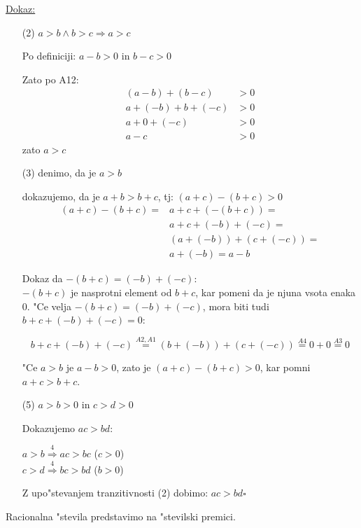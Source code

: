 \underline{Dokaz:}
\begin{enumerate}
	\item[(2)] \(a > b \land b > c \Rightarrow a > c\)
	
	Po definiciji: \(a - b > 0\) in \(b - c > 0\)
	
	Zato po A12:
	\begin{align*}
		(a -b) + (b -c) &> 0\\
		a + (-b) + b + (-c) &> 0\\
		a + 0 + (-c) &> 0 \\
		a - c &> 0
	\end{align*}
	zato \(a > c\)
	
	\item[(3)] denimo, da je \(a > b\)
	
	dokazujemo, da je \(a + b > b + c\), tj: \((a + c) - (b + c) > 0\)
	\begin{align*}
		(a + c) - (b + c) = &a + c + (-(b + c)) =\\
		&a + c + (-b) + (-c) = \\
		&(a + (-b)) + (c + (-c)) =\\
		&a + (-b) = a - b
	\end{align*}
	\begin{adjustwidth}{24pt}{0pt}
		Dokaz da \(-(b + c) = (-b) + (-c)\):\\
		\hspace*{12pt}\(-(b + c)\) je nasprotni element od \(b + c\), kar pomeni da je njuna vsota enaka \(0\). "Ce velja \(-(b + c) = (-b) + (-c)\), mora biti tudi \(b + c + (-b) + (-c) = 0\):
	\end{adjustwidth}
	\[b + c + (-b) + (-c) \stackrel{A2, A1}{=} (b + (-b)) + (c + (-c)) \stackrel{A4}{=} 0 + 0 \stackrel{A3}{=} 0\]
	
	"Ce \(a > b\) je \(a - b > 0\), zato je \((a + c) - (b + c) > 0\), kar pomni \(a + c > b + c\).
	
	\item[(5)] \(a > b > 0\) in \(c > d > 0\)
	
	Dokazujemo \(ac > bd\):
	
	\(a > b \stackrel{4}{\Rightarrow} ac > bc\) (\(c > 0\))\\
	\(c > d \stackrel{4}{\Rightarrow} bc > bd\) (\(b > 0\))
	
	Z upo"stevanjem tranzitivnosti (2) dobimo: \(ac > bd \square \)
\end{enumerate}

Racionalna "stevila predstavimo na "stevilski premici.

